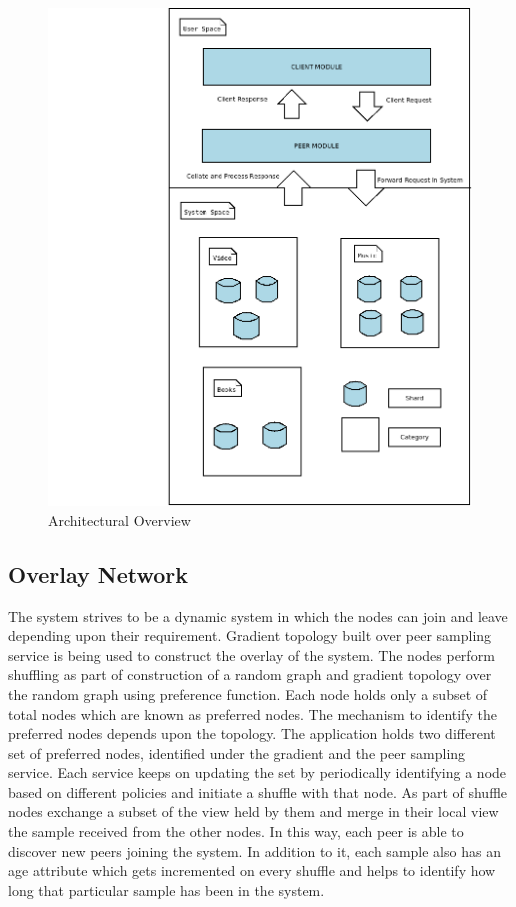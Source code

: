 \documentclass[12pt,a4paper,twoside,openright]{book}
\begin{document}
\begin{figure}[h]
	\includegraphics[scale=0.35]{OverallFunctioning}
	\centering
	\caption{Architectural Overview}
	\label{fig:overall_function}
\end{figure}



\subsection{Overlay Network}

The system strives to be a dynamic system in which the nodes can join and leave depending upon their requirement. Gradient topology built over peer sampling service is being used to construct the overlay of the system. The nodes perform shuffling as part of construction of a random graph and gradient topology over the random graph using preference function. Each node holds only a subset of total nodes which are known as preferred nodes. The mechanism to identify the preferred nodes depends upon the topology. The application holds two different set of preferred nodes, identified under the gradient and the peer sampling service. Each service keeps on updating the set by periodically identifying a node based on different policies and initiate a shuffle with that node. As part of shuffle nodes exchange a subset of the view held by them and merge in their local view the sample received from the other nodes. In this way, each peer is able to discover new peers joining the system. In addition to it, each sample also has an age attribute which gets incremented on every shuffle and helps to identify how long that particular sample has been in the system.
\end{document}
